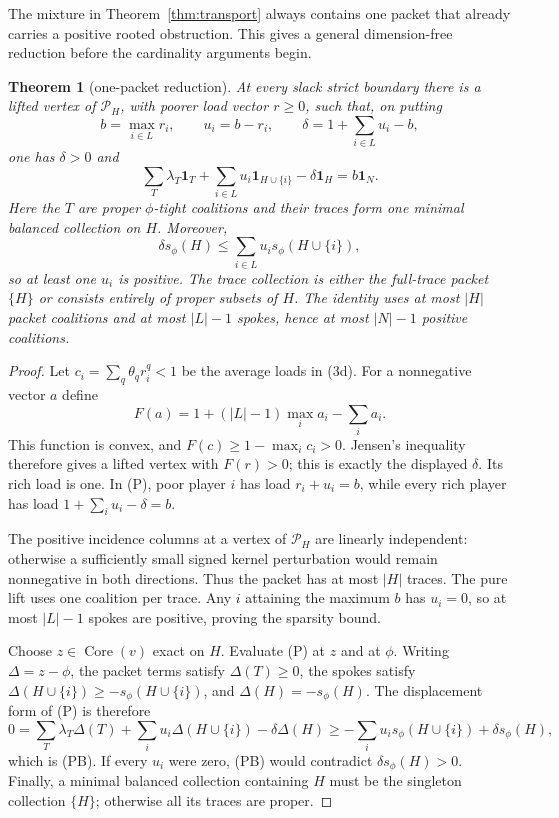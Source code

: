 \documentclass[11pt]{article}
\newtheorem{theorem}{Theorem}
\newcommand{\core}{\operatorname{Core}}
\newcommand{\one}{\mathbf 1}
\begin{document}
The mixture in Theorem~\ref{thm:transport} always contains one packet that
already carries a positive rooted obstruction.  This gives a general
dimension-free reduction before the cardinality arguments begin.

\begin{theorem}[one-packet reduction]\label{thm:packet}
At every slack strict boundary there is a lifted vertex of
$\mathcal P_H$, with poorer load vector $r\ge0$, such that, on putting
\[
 b=\max_{i\in L}r_i,\qquad u_i=b-r_i,
 \qquad \delta=1+\sum_{i\in L}u_i-b,
\]
one has $\delta>0$ and
\[
 \sum_T\lambda_T\one_T
 +\sum_{i\in L}u_i\one_{H\cup\{i\}}
 -\delta\one_H=b\one_N.                            \tag{P}
\]
Here the $T$ are proper $\phi$-tight coalitions and their traces form one
minimal balanced collection on $H$.  Moreover,
\[
 \delta s_\phi(H)
 \le\sum_{i\in L}u_i s_\phi(H\cup\{i\}),           \tag{PB}
\]
so at least one $u_i$ is positive.  The trace collection is either the
full-trace packet $\{H\}$ or consists entirely of proper subsets of $H$.
The identity uses at most $|H|$ packet coalitions and at most $|L|-1$
spokes, hence at most $|N|-1$ positive coalitions.
\end{theorem}

\begin{proof}
Let $c_i=\sum_q\theta_qr_i^q<1$ be the average loads in (3d).  For a
nonnegative vector $a$ define
\[
 F(a)=1+(|L|-1)\max_i a_i-\sum_i a_i.
\]
This function is convex, and
$F(c)\ge1-\max_i c_i>0$.  Jensen's inequality therefore gives a lifted
vertex with $F(r)>0$; this is exactly the displayed $\delta$.  Its rich load
is one.  In (P), poor player $i$ has load $r_i+u_i=b$, while every rich
player has load $1+\sum_i u_i-\delta=b$.

The positive incidence columns at a vertex of $\mathcal P_H$ are linearly
independent: otherwise a sufficiently small signed kernel perturbation would
remain nonnegative in both directions.  Thus the packet has at most $|H|$
traces.  The pure lift uses one coalition per trace.  Any $i$ attaining the
maximum $b$ has $u_i=0$, so at most $|L|-1$ spokes are positive, proving the
sparsity bound.

Choose $z\in\core(v)$ exact on $H$.  Evaluate (P) at $z$ and at $\phi$.
Writing $\Delta=z-\phi$, the packet terms satisfy $\Delta(T)\ge0$, the
spokes satisfy
$\Delta(H\cup\{i\})\ge-s_\phi(H\cup\{i\})$, and
$\Delta(H)=-s_\phi(H)$.  The displacement form of (P) is therefore
\[
 0=\sum_T\lambda_T\Delta(T)
   +\sum_i u_i\Delta(H\cup\{i\})-\delta\Delta(H)
 \ge-\sum_i u_i s_\phi(H\cup\{i\})+\delta s_\phi(H),
\]
which is (PB).  If every $u_i$ were zero, (PB) would contradict
$\delta s_\phi(H)>0$.  Finally, a minimal balanced collection containing $H$
must be the singleton collection $\{H\}$; otherwise all its traces are proper.
\end{proof}
\end{document}
